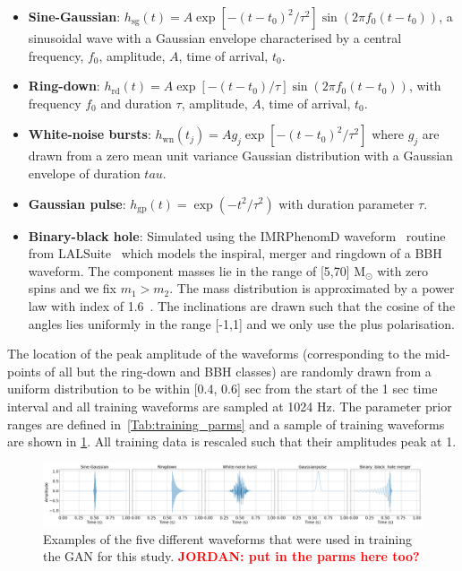 \documentclass[12pt]{iopart}
\newcommand{\jordan}[1]{\textbf{\textcolor{red}{JORDAN: #1}}}
\begin{document}
%
\begin{itemize}
%
\item {\bf Sine-Gaussian}: $h_{\text{sg}}(t) = A \exp\left[ - (t-t_{0})^2 /
\tau^2 \right] \sin (2 \pi f_0 (t-t_0))$, a sinusoidal wave with a Gaussian
envelope characterised by a central frequency, $f_0$, amplitude, $A$, time of arrival, $t_{0}$. 
%
\item {\bf Ring-down}: $h_{\text{rd}}(t) = A \exp \left[-{(t-t_0)} / {\tau}
\right] \sin(2 \pi f_0 (t-t_0))$, with frequency $f_0$ and duration $\tau$, amplitude, $A$, time of arrival, $t_{0}$. 
%
\item {\bf White-noise bursts}: $h_{\text{wn}}(t_j) = Ag_j\exp\left[ -
(t-t_{0})^2 / \tau^2 \right]$ where $g_j$ are drawn from a zero mean unit
variance Gaussian distribution with a Gaussian envelope of duration $tau$.
%
\item {\bf Gaussian pulse}: $h_{\text{gp}}(t) = \exp(-t^2 / \tau^2)$ with
duration parameter $\tau$.
%
\item {\bf Binary-black hole}: Simulated using the IMRPhenomD
waveform~\cite{Khan_2016} routine from LALSuite~\cite{lalsuite} which models
the inspiral, merger and ringdown of a \ac{BBH} waveform. The component masses
lie in the range of [5,70] $\textrm{M}_{\odot}$ with zero spins and we fix
$m_1>m_2$. The mass distribution is approximated by a power law with
index of 1.6~\cite{Abbott_2019}. The inclinations are drawn
such that the cosine of the angles lies uniformly in the range [-1,1] and we only use the plus polarisation.
%
\end{itemize}
%
The location of the peak amplitude of the waveforms (corresponding to the
mid-points of all but the ring-down and \ac{BBH} classes) are randomly drawn from a uniform distribution to
be within [0.4, 0.6] sec from the start of the 1 sec time interval and all
training waveforms are sampled at 1024 Hz.  The parameter prior ranges are
defined in~\cref{Tab:training_parms} and a sample of training waveforms are shown in \ref{fig:training_waveforms}. All training data is rescaled such that their amplitudes peak at 1.

\begin{figure}
    \centering
    \includegraphics[width=\textwidth]{Paper_draft/figures/training-4.png}
    \caption{Examples of the five different waveforms that were used in training the \ac{GAN} for this study. \jordan{put in the parms here too?}}
    \label{fig:training_waveforms}
\end{figure}
\end{document}
